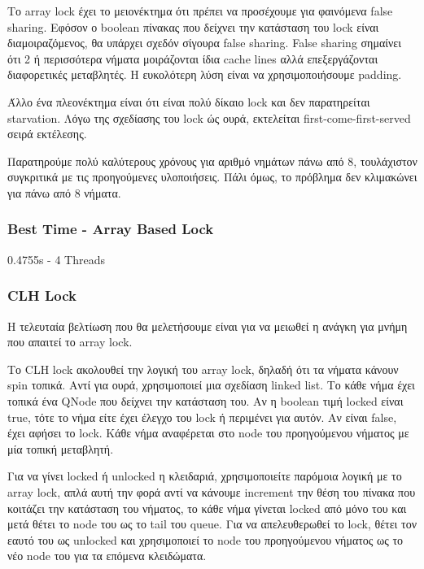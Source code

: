 \documentclass[../final_report.tex]{subfiles}
\begin{document}
Το array lock έχει το μειονέκτημα ότι πρέπει να προσέχουμε για φαινόμενα false sharing. Εφόσον ο boolean πίνακας που 
δείχνει την κατάσταση του lock είναι διαμοιραζόμενος, θα υπάρχει σχεδόν σίγουρα false sharing. False sharing 
σημαίνει ότι 2 ή περισσότερα νήματα μοιράζονται ίδια cache lines αλλά επεξεργάζονται διαφορετικές μεταβλητές.
Η ευκολότερη λύση είναι να χρησιμοποιήσουμε padding.

Άλλο ένα πλεονέκτημα είναι ότι είναι πολύ δίκαιο lock και δεν παρατηρείται starvation. Λόγω της σχεδίασης του lock ώς
ουρά, εκτελείται first-come-first-served σειρά εκτέλεσης.

Παρατηρούμε πολύ καλύτερους χρόνους για αριθμό νημάτων πάνω από 8, τουλάχιστον συγκριτικά με τις προηγούμενες υλοποιήσεις. 
Πάλι όμως, το πρόβλημα δεν κλιμακώνει για πάνω από 8 νήματα. 

\subsubsection*{Best Time - Array Based Lock}
0.4755s - 4 Threads

\subsubsection{CLH Lock}

Η τελευταία βελτίωση που θα μελετήσουμε είναι για να μειωθεί η ανάγκη για μνήμη που απαιτεί το array lock.

Το CLH lock ακολουθεί την λογική του array lock, δηλαδή ότι τα νήματα κάνουν spin τοπικά. Αντί για ουρά,
χρησιμοποιεί μια σχεδίαση linked list. Το κάθε νήμα έχει τοπικά ένα QNode που δείχνει την κατάσταση του.
Αν η boolean τιμή locked είναι true, τότε το νήμα είτε έχει έλεγχο του lock ή περιμένει για αυτόν. Αν είναι false,
έχει αφήσει το lock. Κάθε νήμα αναφέρεται στο node του προηγούμενου νήματος με μία τοπική μεταβλητή.

Για να γίνει locked ή unlocked η κλειδαριά, χρησιμοποιείτε παρόμοια λογική με το array lock, απλά αυτή την φορά
αντί να κάνουμε increment την θέση του πίνακα που κοιτάζει την κατάσταση του νήματος, το κάθε νήμα
γίνεται locked από μόνο του και μετά θέτει το node του ως το tail του queue. Για να απελευθερωθεί το lock, 
θέτει τον εαυτό του ως unlocked και χρησιμοποιεί το node του προηγούμενου νήματος ως το νέο node του για 
τα επόμενα κλειδώματα.
\end{document}

